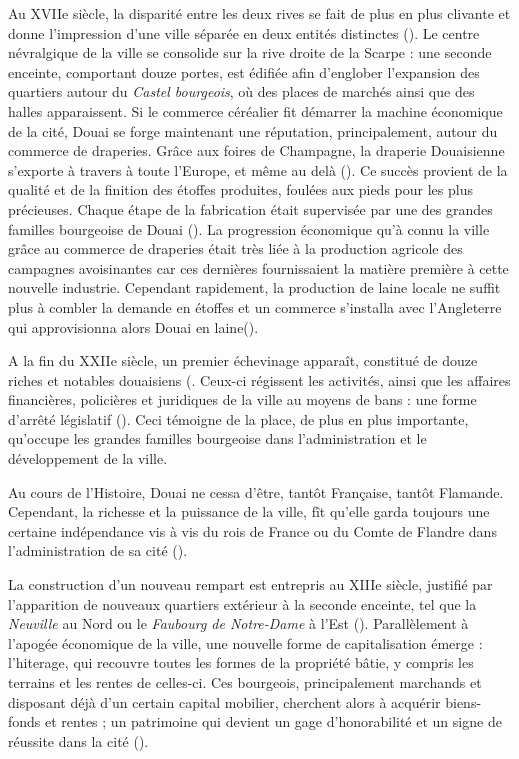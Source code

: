 Au XVIIe siècle, la disparité entre les deux rives se fait de plus en plus clivante et donne l'impression d'une ville séparée en deux entités distinctes (\cite{leroy-langelin_quartier_2012}). 
Le centre névralgique de la ville se consolide sur la rive droite de la Scarpe : une seconde enceinte, comportant douze portes, est édifiée afin d'englober l'expansion des quartiers autour du \textit{Castel bourgeois}, où des places de marchés ainsi que des halles apparaissent. 
Si le commerce céréalier fit démarrer la machine économique de la cité, Douai se forge maintenant une réputation, principalement, autour du commerce de draperies. Grâce aux foires de Champagne, la draperie Douaisienne s'exporte à travers à toute l'Europe, et même au delà (\cite{clisant_vie_2003}). Ce succès provient de la qualité et de la finition des étoffes produites, foulées aux pieds pour les plus précieuses. Chaque étape de la fabrication était supervisée par une des grandes familles bourgeoise de Douai (\cite{clisant_vie_2003}).
La progression économique qu'à connu la ville grâce au commerce de draperies était très liée à la production agricole des campagnes avoisinantes car ces dernières fournissaient la matière première à cette nouvelle industrie.
Cependant rapidement, la production de laine locale ne suffit plus à combler la demande en étoffes et un commerce s'installa avec l'Angleterre qui approvisionna alors Douai en laine(\cite{clisant_vie_2003}).

A la fin du XXIIe siècle, un premier échevinage apparaît, constitué de douze riches et notables douaisiens (\cite{mestayer_douai_2016}. Ceux-ci régissent les activités, ainsi que les affaires financières, policières et juridiques  de la ville au moyens de bans : une forme d'arrêté législatif (\cite{officedutourisme_douai_2016}). Ceci témoigne de la place, de plus en plus importante, qu'occupe les grandes familles bourgeoise dans l'administration et le développement de la ville.

Au cours de l'Histoire, Douai ne cessa d'être, tantôt Française, tantôt Flamande. Cependant, la richesse et la puissance de la ville, fît  qu'elle garda toujours une certaine indépendance vis à vis du rois de France ou du Comte de Flandre dans l'administration de sa cité (\cite{mestayer_douai_2016}).

La construction d'un nouveau rempart est entrepris au XIIIe siècle, justifié par l'apparition de nouveaux quartiers extérieur à la seconde enceinte, tel que la \textit{Neuville} au  Nord ou le \textit{Faubourg de Notre-Dame} à l'Est (\cite{netteghem_histoire_2021}).
Parallèlement à l'apogée économique de la ville, une nouvelle forme de capitalisation émerge : l'hiterage, qui recouvre toutes les formes de la propriété bâtie, y compris les terrains et les rentes de celles-ci. Ces bourgeois, principalement marchands et disposant déjà d'un certain capital mobilier, cherchent alors à acquérir biens-fonds et rentes ; un patrimoine qui devient un gage d'honorabilité et un signe de réussite dans la cité  (\cite{leguay_propriete_1989}). 

